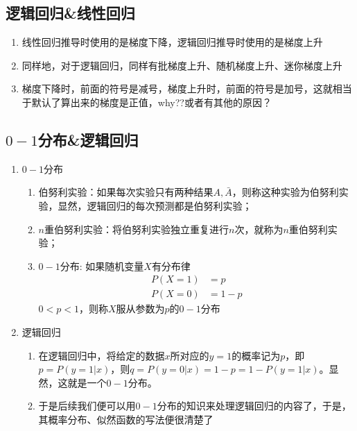 \begin{enumerate}
\begin{enumerate}
\begin{enumerate}
		\end{enumerate}
	\end{enumerate}

\end{enumerate}

\subsection{逻辑回归\&线性回归}
\begin{enumerate}
	\item 线性回归推导时使用的是梯度下降，逻辑回归推导时使用的是梯度上升
	\item 同样地，对于逻辑回归，同样有批梯度上升、随机梯度上升、迷你梯度上升
	\item 梯度下降时，前面的符号是减号，梯度上升时，前面的符号是加号，这就相当于默认了算出来的梯度是正值，why??或者有其他的原因？
\end{enumerate}


\subsection{$0-1$分布\&逻辑回归}
{\color{red}{以下内容正确性待验证}}
\begin{enumerate}
	\item $0-1$分布
	\begin{enumerate}
		\item 伯努利实验：如果每次实验只有两种结果$A, \bar A$，则称这种实验为伯努利实验，显然，逻辑回归的每次预测都是伯努利实验；
		\item $n$重伯努利实验：将伯努利实验独立重复进行$n$次，就称为$n$重伯努利实验；
		\item $0-1$分布: 如果随机变量$X$有分布律
		\begin{align}
			P(X=1) &= p \\
			P(X=0) &= 1-p
		\end{align}
		$0<p<1$，则称$X$服从参数为$p$的$0-1$分布
	\end{enumerate}

	\item 逻辑回归
	\begin{enumerate}
		\item 在逻辑回归中，将给定的数据$x$所对应的$y=1$的概率记为$p$，即$p=P(y=1|x)$，则$q=P(y=0|x)=1-p=1-P(y=1|x)$。显然，这就是一个$0-1$分布。
		\item 于是后续我们便可以用$0-1$分布的知识来处理逻辑回归的内容了，于是，其概率分布、似然函数的写法便很清楚了
	\end{enumerate}
\end{enumerate}






















